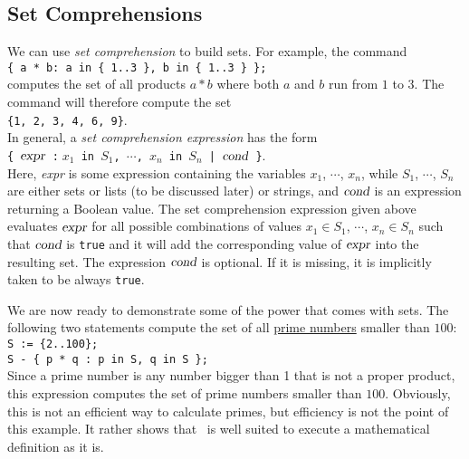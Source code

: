 \subsection{Set Comprehensions}
We can use \emph{set comprehension} to build sets.  For example, the command
\\[0.2cm]
\hspace*{1.3cm}
\texttt{\{ a * b: a in \{ 1..3 \}, b in \{ 1..3 \} \};}
\\[0.2cm]
computes the set of all products $a * b$ where both $a$ and $b$ run from $1$ to $3$.
The command will therefore compute the set
\\[0.2cm]
\hspace*{1.3cm}
\texttt{\{1, 2, 3, 4, 6, 9\}}.
\\[0.2cm]
In general, a \emph{set comprehension expression} has the form
\\[0.2cm]
\hspace*{1.3cm}
\texttt{\{ $\textsl{expr}$ :$\;x_1$ in $S_1$, $\cdots$, $x_n$ in $S_n$ | $\textsl{cond}$ \}}.
\\[0.2cm]
Here, \textsl{expr} is some expression containing the variables $x_1$, $\cdots$, $x_n$, while
$S_1$, $\cdots$, $S_n$ are either sets or lists (to be discussed later) or strings, and $\textsl{cond}$ is an
expression returning a Boolean value.  
The  set comprehension expression given above evaluates $\textsl{expr}$ for all possible combinations of 
values $x_1 \in S_1$, $\cdots$, $x_n \in S_n$ such that $\textsl{cond}$ is \texttt{true} and it will add the
corresponding value of $\textsl{expr}$ into the resulting set.
The expression $\textsl{cond}$ is optional.  If it is missing, it is implicitly taken to be
always \texttt{true}.

We are now ready to demonstrate some of the power that comes with sets.  
The following two statements compute the set of all \href{https://en.wikipedia.org/wiki/Prime_number}{prime numbers} smaller than $100$:
\\[0.2cm]
\hspace*{1.3cm}
\texttt{S := \{2..100\};}
\\
\hspace*{1.3cm}
\texttt{S - \{ p * q : p in S, q in S \};}
\\[0.2cm]
Since a prime number is any number bigger than 1 that is not a proper product, this expression computes the set
of prime numbers smaller than $100$.  
Obviously, this is not an efficient way to calculate primes, but efficiency is not the
point of this example.  It rather shows that \setlx\ is well suited to execute a
mathematical definition as it is.

